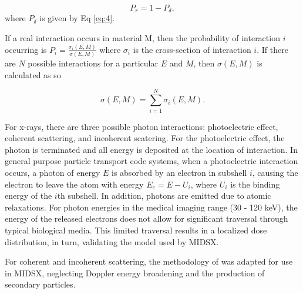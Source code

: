 \begin{equation}
    P_r = 1 - P_\delta,
\end{equation}
where $P_\delta$ is given by Eq \ref{eq:4}.
\\
\par If a real interaction occurs in material M, then the probability of interaction $i$ occurring is $P_i = \frac{\sigma_i(E, M)}{\sigma (E, M)}$ where $\sigma_i$ is the cross-section of interaction $i$. If there are $N$ possible interactions for a particular $E$ and $M$, then $\sigma (E, M)$ is calculated as so

\begin{equation}
    \sigma (E, M) = \sum_{i=1}^{N} \sigma_i(E, M).
\end{equation}


\par For x-rays, there are three possible photon interactions: photoelectric effect, coherent scattering, and incoherent scatering. For the photoelectric effect, the photon is terminated and all energy is deposited at the location of interaction. In general purpose particle transport code systems, when a photoelectric interaction occurs, a photon of energy $E$ is absorbed by an electron in subshell $i$, causing the electron to leave the atom with energy $E_e = E - U_i$, where $U_i$ is the binding energy of the $i$th subshell. In addition, photons are emitted due to atomic relaxations. For photon energies in the medical imaging range (30 - 120 keV), the energy of the released electrons does not allow for significant traversal through typical biological media. This limited traversal results in a localized dose distribution, in turn, validating the model used by MIDSX.

\par For coherent and incoherent scattering, the methodology of \cite{lund2018implementation} was adapted for use in MIDSX, neglecting Doppler energy broadening and the production of secondary particles.



